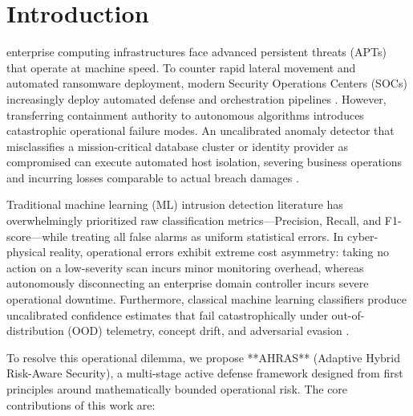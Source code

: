 \documentclass[10pt,journal,compsoc]{IEEEtran}
\begin{document}
\section{Introduction}
 enterprise computing infrastructures face advanced persistent threats (APTs) that operate at machine speed. To counter rapid lateral movement and automated ransomware deployment, modern Security Operations Centers (SOCs) increasingly deploy automated defense and orchestration pipelines \cite{sommer2010outside, apruzzese2023real}. However, transferring containment authority to autonomous algorithms introduces catastrophic operational failure modes. An uncalibrated anomaly detector that misclassifies a mission-critical database cluster or identity provider as compromised can execute automated host isolation, severing business operations and incurring losses comparable to actual breach damages \cite{arp2022dos}.

Traditional machine learning (ML) intrusion detection literature has overwhelmingly prioritized raw classification metrics---Precision, Recall, and F1-score---while treating all false alarms as uniform statistical errors. In cyber-physical reality, operational errors exhibit extreme cost asymmetry: taking no action on a low-severity scan incurs minor monitoring overhead, whereas autonomously disconnecting an enterprise domain controller incurs severe operational downtime. Furthermore, classical machine learning classifiers produce uncalibrated confidence estimates that fail catastrophically under out-of-distribution (OOD) telemetry, concept drift, and adversarial evasion \cite{madry2018towards}.

To resolve this operational dilemma, we propose **AHRAS** (Adaptive Hybrid Risk-Aware Security), a multi-stage active defense framework designed from first principles around mathematically bounded operational risk. The core contributions of this work are:
\end{document}
